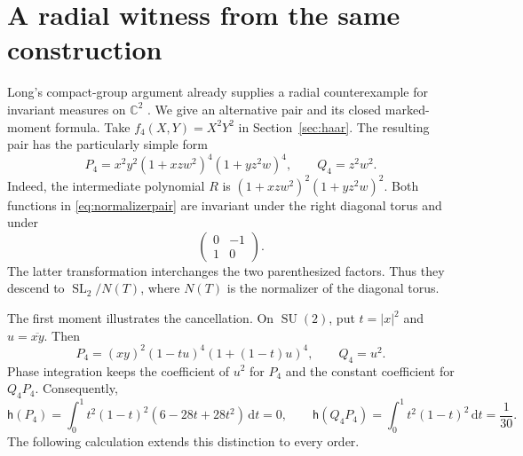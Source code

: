 \documentclass[11pt]{article}
\numberwithin{equation}{section}
\theoremstyle{definition}
\theoremstyle{remark}
\newcommand{\C}{\mathbb C}
\newcommand{\dd}{\,\mathrm d}
\newcommand{\h}{\mathsf h}
\newcommand{\SL}{\operatorname{SL}}
\newcommand{\SU}{\operatorname{SU}}
\begin{document}
\section{A radial witness from the same construction}\label{sec:radial}

Long's compact-group argument already supplies a radial counterexample
for invariant measures on $\C^2$ \cite[Theorem~4.1]{LongCompact}.
We give an alternative pair and its closed marked-moment formula.
Take $f_4(X,Y)=X^2Y^2$ in Section~\ref{sec:haar}. The resulting pair
has the particularly simple form
\begin{equation}\label{eq:normalizerpair}
 P_4=x^2y^2(1+xzw^2)^4(1+yz^2w)^4,\qquad Q_4=z^2w^2.
\end{equation}
Indeed, the intermediate polynomial $R$ is
$(1+xzw^2)^2(1+yz^2w)^2$. Both functions in
\eqref{eq:normalizerpair} are invariant under the right diagonal torus
and under
\[
 \begin{pmatrix}0&-1\\1&0\end{pmatrix}.
\]
The latter transformation interchanges the two parenthesized factors.
Thus they descend to $\SL_2/N(T)$, where $N(T)$ is the normalizer of
the diagonal torus.

The first moment illustrates the cancellation. On $\SU(2)$, put
$t=|x|^2$ and $u=\overline{xy}$. Then
\[
 P_4=(xy)^2(1-tu)^4(1+(1-t)u)^4,\qquad Q_4=u^2.
\]
Phase integration keeps the coefficient of $u^2$ for $P_4$ and the
constant coefficient for $Q_4P_4$. Consequently,
\[
 \h(P_4)=\int_0^1t^2(1-t)^2(6-28t+28t^2)\dd t=0,
 \qquad \h(Q_4P_4)=\int_0^1t^2(1-t)^2\dd t=\frac1{30}.
\]
The following calculation extends this distinction to every order.
\end{document}

